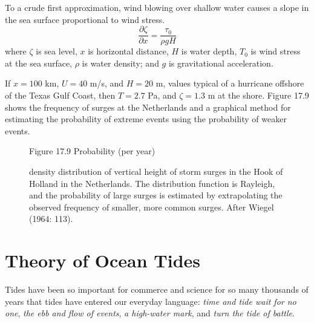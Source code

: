 To a crude first approximation, wind blowing over shallow water causes a slope in the sea surface proportional to wind stress.
\begin{equation}
\frac{\partial \zeta }{\partial x}= \frac{\tau _{0}}{\rho g H}
\end{equation}
where $\zeta $ is sea level, $x$ is horizontal distance, $H$ is water depth, $T_{0}$ is wind stress at the sea surface, $\rho $ is water density; and $g$ is gravitational acceleration.

If $x=100$ km, $U=40$ m/s, and $H=20$ m, values typical of a hurricane offshore of the Texas Gulf Coast, then $T= 2.7$ Pa, and $\zeta = 1.3$ m at the shore. Figure 17.9 shows the frequency of surges at the Netherlands and a graphical method for estimating the probability of extreme events using the probability of weaker events.

\begin{figure}[t!]
\footnotesize Figure 17.9 Probability (per year) \rule{0mm}{3ex}density distribution of vertical height of storm surges in the Hook of Holland in the Netherlands. The distribution function is Rayleigh, and the probability of large surges is estimated by extrapolating the observed frequency of smaller, more common surges. After Wiegel (1964: 113).
\label{fig:surgeprob}
\vspace{-3ex}
\end{figure}

\section{Theory of Ocean Tides}
Tides have been so important for commerce and science for so many thousands of years that tides have entered our everyday language: \textit{time and tide wait for no one}, \textit{the ebb and flow of events}, \textit{a high-water mark}, and \textit{turn the tide of battle}.

